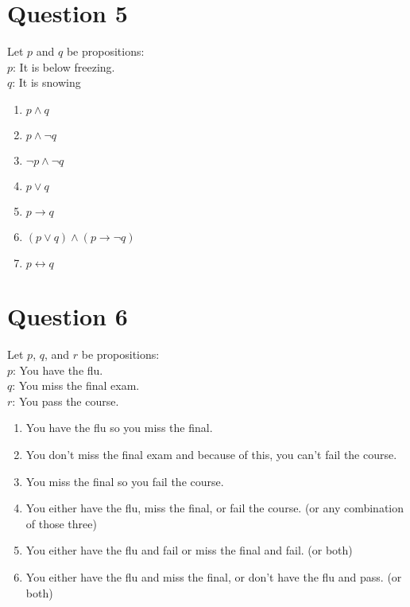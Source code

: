 \documentclass[12pt]{extarticle}
\begin{document}
\section*{Question 5}
	Let $p$ and $q$ be propositions:\\
		\hspace*{1cm}$p$: It is below freezing.\\
		\hspace*{1cm}$q$: It is snowing\\
	\begin{enumerate}
		\item $p \wedge q$
		\item $p \wedge \neg q$
		\item $\neg p \wedge \neg q$
		\item $p \vee q$
		\item $p \to q$
		\item $(p \vee q) \wedge (p \to \neg q)$
		\item $p \leftrightarrow q$
	\end{enumerate}

\section*{Question 6}
	Let $p$, $q$, and $r$ be propositions:\\
		\hspace*{1cm}$p$: You have the flu.\\
		\hspace*{1cm}$q$: You miss the final exam.\\
		\hspace*{1cm}$r$: You pass the course.\\
	\begin{enumerate}
		\item You have the flu so you miss the final.
		\item You don't miss the final exam and because of this, you can't fail the course.
		\item You miss the final so you fail the course.
		\item You either have the flu, miss the final, or fail the course. (or any combination of those three)
		\item You either have the flu and fail or miss the final and fail. (or both) 
		\item You either have the flu and miss the final, or don't have the flu and pass. (or both)
	\end{enumerate}
	\clearpage
\end{document}
